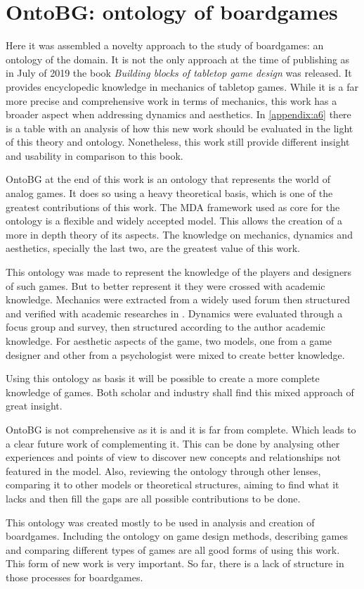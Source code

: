 \section{OntoBG: ontology of boardgames}

Here it was assembled a novelty approach to the study of boardgames: an ontology of the domain. It is not the only approach at the time of publishing as in July of 2019 the book \textit{Building blocks of tabletop game design} \cite{engelstein2019building} was released. It provides encyclopedic knowledge in mechanics of tabletop games. While it is a far more precise and comprehensive work in terms of mechanics, this work has a broader aspect when addressing dynamics and aesthetics. In \autoref{appendix:a6} there is a table with an analysis of how this new work should be evaluated in the light of this theory and ontology. Nonetheless, this work still provide different insight and usability in comparison to this book.

OntoBG at the end of this work is an ontology that represents the world of analog games. It does so using a heavy theoretical basis, which is one of the greatest contributions of this work. The MDA framework used as core for the ontology is a flexible and widely accepted model. This allows the creation of a more in depth theory of its aspects. The knowledge on mechanics, dynamics and aesthetics, specially the last two, are the greatest value of this work. 

This ontology was made to represent the knowledge of the players and designers of such games. But to better represent it they were crossed with academic knowledge. Mechanics were extracted from a widely used forum then structured and verified with academic researches in \cite{kritz_buildingOntology}. Dynamics were evaluated through a focus group and survey, then structured according to the author academic knowledge. For aesthetic aspects of the game, two models, one from a game designer and other from a psychologist were mixed to create better knowledge.

Using this ontology as basis it will be possible to create a more complete knowledge of games. Both scholar and industry shall find this mixed approach of great insight.

OntoBG is not comprehensive as it is and it is far from complete. Which leads to a clear future work of complementing it. This can be done by analysing other experiences and points of view to discover new concepts and relationships not featured in the model. Also, reviewing the ontology through other lenses, comparing it to other models or theoretical structures, aiming to find what it lacks and then fill the gaps are all possible contributions to be done.

This ontology was created mostly to be used in analysis and creation of boardgames. Including the ontology on game design methods, describing games and comparing different types of games are all good forms of using this work. This form of new work is very important. So far, there is a lack of structure in those processes for boardgames.

